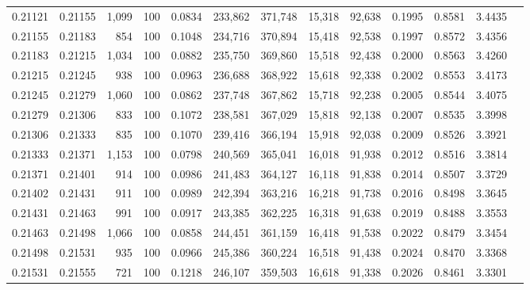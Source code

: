 \begin{tabular}{rrrrrrrrrrrrr}
0.21121 & 0.21155 & 1,099 & 100 &                                     0.0834 & 233,862 & 371,748 &  15,318 &  92,638 & 0.1995 & 0.8581 & 3.4435 \\
0.21155 & 0.21183 &   854 & 100 &                                     0.1048 & 234,716 & 370,894 &  15,418 &  92,538 & 0.1997 & 0.8572 & 3.4356 \\
0.21183 & 0.21215 & 1,034 & 100 &                                     0.0882 & 235,750 & 369,860 &  15,518 &  92,438 & 0.2000 & 0.8563 & 3.4260 \\
0.21215 & 0.21245 &   938 & 100 &                                     0.0963 & 236,688 & 368,922 &  15,618 &  92,338 & 0.2002 & 0.8553 & 3.4173 \\
0.21245 & 0.21279 & 1,060 & 100 &                                     0.0862 & 237,748 & 367,862 &  15,718 &  92,238 & 0.2005 & 0.8544 & 3.4075 \\
0.21279 & 0.21306 &   833 & 100 &                                     0.1072 & 238,581 & 367,029 &  15,818 &  92,138 & 0.2007 & 0.8535 & 3.3998 \\
0.21306 & 0.21333 &   835 & 100 &                                     0.1070 & 239,416 & 366,194 &  15,918 &  92,038 & 0.2009 & 0.8526 & 3.3921 \\
0.21333 & 0.21371 & 1,153 & 100 &                                     0.0798 & 240,569 & 365,041 &  16,018 &  91,938 & 0.2012 & 0.8516 & 3.3814 \\
0.21371 & 0.21401 &   914 & 100 &                                     0.0986 & 241,483 & 364,127 &  16,118 &  91,838 & 0.2014 & 0.8507 & 3.3729 \\
0.21402 & 0.21431 &   911 & 100 &                                     0.0989 & 242,394 & 363,216 &  16,218 &  91,738 & 0.2016 & 0.8498 & 3.3645 \\
0.21431 & 0.21463 &   991 & 100 &                                     0.0917 & 243,385 & 362,225 &  16,318 &  91,638 & 0.2019 & 0.8488 & 3.3553 \\
0.21463 & 0.21498 & 1,066 & 100 &                                     0.0858 & 244,451 & 361,159 &  16,418 &  91,538 & 0.2022 & 0.8479 & 3.3454 \\
0.21498 & 0.21531 &   935 & 100 &                                     0.0966 & 245,386 & 360,224 &  16,518 &  91,438 & 0.2024 & 0.8470 & 3.3368 \\
0.21531 & 0.21555 &   721 & 100 &                                     0.1218 & 246,107 & 359,503 &  16,618 &  91,338 & 0.2026 & 0.8461 & 3.3301 \\

\end{tabular}
